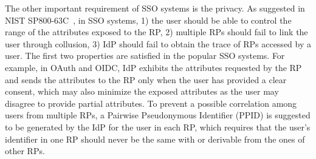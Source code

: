 

The other important requirement of SSO systems is the privacy. As suggested in NIST SP800-63C~\cite{NIST2017draft}, in SSO systems, 1) the user should be able to control the range of the attributes exposed to the RP, 2) multiple RPs should fail to link the user through collusion, 3) IdP should fail to obtain the trace of RPs accessed by a user. The first two properties are satisfied in the popular SSO systems. For example, in OAuth and OIDC, IdP exhibits the  attributes requested by the RP and sends the attributes to the RP only when the user has provided a clear consent, which may also minimize the exposed attributes as the user may disagree to provide partial attributes. To prevent a possible correlation among users from multiple RPs, a Pairwise Pseudonymous Identifier (PPID) is suggested to be generated by the IdP for the user in each RP, which requires that  the user's identifier in one RP should never be the same with or derivable from the ones of other RPs.



